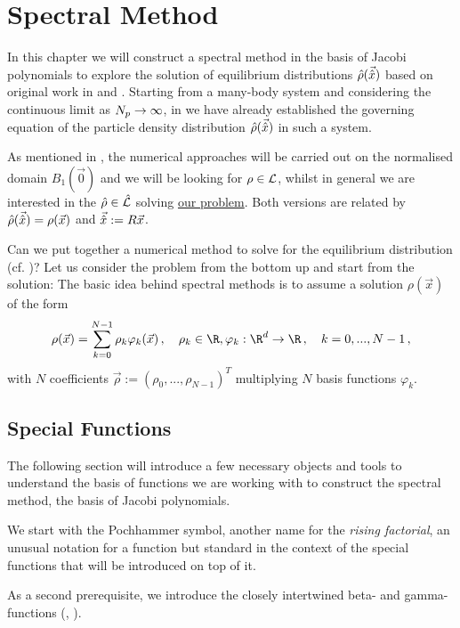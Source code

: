 \chapter{Spectral Method}
\label{chap:spectral-method}
In this chapter we will construct a spectral method in the basis of Jacobi polynomials to explore the solution of equilibrium distributions $\hat{\rho}(\vec{\hat{x}})$ based on original work in \cite{2020-power-law-kernels} and \cite{2021-arbitrary-dimensions}.
Starting from a many-body system and considering the continuous limit as $N_p \rightarrow \infty$, in  we have already established the governing equation of the particle density distribution $\hat{\rho}(\vec{\hat{x}})$ in such a system.

As mentioned in , the numerical approaches will be carried out on the normalised domain $B_1(\vec{0})$ and we will be looking for $\rho \in \mathcal{L}$, whilst in general we are interested in the $\hat{\rho} \in \hat{\mathcal{L}}$ solving \href{def:the-problem}{our problem}.
Both versions are related by $\hat{\rho}(\vec{\hat{x}}) = \rho(\vec{x})$ and $\vec{\hat{x}} := R \vec{x}$.

Can we put together a numerical method to solve for the equilibrium distribution (cf. )?
Let us consider the problem from the bottom up and start from the solution:
The basic idea behind spectral methods is to assume a solution $\rho(\vec{x})$ of the form
$$\rho(\vec{x}) = \sum_{k=0}^{N-1} \rho_k \varphi_k(\vec{x})\,,\quad \rho_k \in \R, \varphi_k: \R^d \to \R\,,\quad k = 0, ..., N-1\,,$$
with $N$ coefficients $\vec{\rho} := \left(\rho_0, ..., \rho_{N-1}\right)^T$ multiplying $N$ basis functions $\varphi_k$.

\pagebreak
\section{Special Functions}
The following section will introduce a few necessary objects and tools to understand the basis of functions we are working with to construct the spectral method, the basis of Jacobi polynomials.

We start with the Pochhammer symbol, another name for the \textit{rising factorial}, an unusual notation for a function but standard in the context of the special functions that will be introduced on top of it.


As a second prerequisite, we introduce the closely intertwined beta- and gamma-functions (, ).



